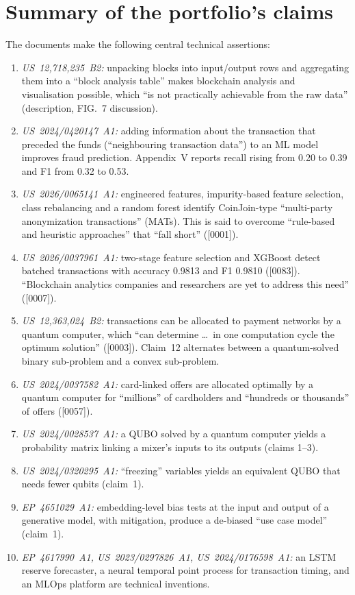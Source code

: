 \documentclass[10pt,a4paper]{article}
\begin{document}
\section*{Summary of the portfolio's claims}
The documents make the following central technical assertions:
\begin{enumerate}[label=(C\arabic*)]
  \item \emph{US~12,718,235~B2:} unpacking blocks into input/output rows and aggregating them into a ``block analysis table'' makes blockchain analysis and visualisation possible, which ``is not practically achievable from the raw data'' (description, FIG.~7 discussion).
  \item \emph{US~2024/0420147~A1:} adding information about the transaction that preceded the funds (``neighbouring transaction data'') to an ML model improves fraud prediction. Appendix~V reports recall rising from 0.20 to 0.39 and F1 from 0.32 to 0.53.
  \item \emph{US~2026/0065141~A1:} engineered features, impurity-based feature selection, class rebalancing and a random forest identify CoinJoin-type ``multi-party anonymization transactions'' (MATs). This is said to overcome ``rule-based and heuristic approaches'' that ``fall short'' ([0001]).
  \item \emph{US~2026/0037961~A1:} two-stage feature selection and XGBoost detect batched transactions with accuracy 0.9813 and F1 0.9810 ([0083]). ``Blockchain analytics companies and researchers are yet to address this need'' ([0007]).
  \item \emph{US~12,363,024~B2:} transactions can be allocated to payment networks by a quantum computer, which ``can determine \ldots\ in one computation cycle the optimum solution'' ([0003]). Claim~12 alternates between a quantum-solved binary sub-problem and a convex sub-problem.
  \item \emph{US~2024/0037582~A1:} card-linked offers are allocated optimally by a quantum computer for ``millions'' of cardholders and ``hundreds or thousands'' of offers ([0057]).
  \item \emph{US~2024/0028537~A1:} a QUBO solved by a quantum computer yields a probability matrix linking a mixer's inputs to its outputs (claims 1--3).
  \item \emph{US~2024/0320295~A1:} ``freezing'' variables yields an equivalent QUBO that needs fewer qubits (claim~1).
  \item \emph{EP~4651029~A1:} embedding-level bias tests at the input and output of a generative model, with mitigation, produce a de-biased ``use case model'' (claim~1).
  \item \emph{EP~4617990~A1, US~2023/0297826~A1, US~2024/0176598~A1:} an LSTM reserve forecaster, a neural temporal point process for transaction timing, and an MLOps platform are technical inventions.
\end{enumerate}
\end{document}
